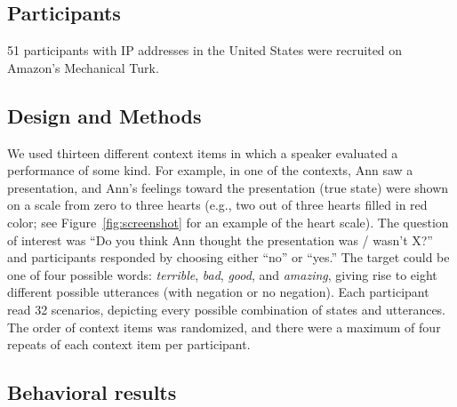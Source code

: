 \documentclass[oneside]{report}
\begin{document}
\subsection{Participants}\label{participants-5}

51 participants with IP addresses in the United States were recruited on
Amazon's Mechanical Turk.

\subsection{Design and Methods}\label{design-and-methods-1}

We used thirteen different context items in which a speaker evaluated a
performance of some kind. For example, in one of the contexts, Ann saw a
presentation, and Ann's feelings toward the presentation (true state)
were shown on a scale from zero to three hearts (e.g., two out of three
hearts filled in red color; see Figure~\ref{fig:screenshot} for an
example of the heart scale). The question of interest was ``Do you think
Ann thought the presentation was / wasn't X?'' and participants
responded by choosing either ``no'' or ``yes.'' The target could be one
of four possible words: \emph{terrible}, \emph{bad}, \emph{good}, and
\emph{amazing}, giving rise to eight different possible utterances (with
negation or no negation). Each participant read 32 scenarios, depicting
every possible combination of states and utterances. The order of
context items was randomized, and there were a maximum of four repeats
of each context item per participant.

\subsection{Behavioral results}\label{behavioral-results-1}
\end{document}
